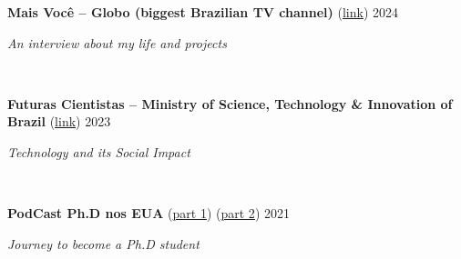 \documentclass[letterpaper,10pt]{article}
\newcommand{\entry}[4]{

\begin{minipage}[t]{.15\textwidth}
\end{minipage}
\hfill\vline\hfill 
\begin{minipage}[t]{0.95\textwidth}
#2 \hfill \textsc{#1}

\textit{#3}

\footnotesize{#4}
\end{minipage}\\\vspace{.25cm}}
\begin{document}
\entry{2024}{\textbf{Mais Você -- Globo (biggest Brazilian TV channel)} (\href{https://globoplay.globo.com/v/12673677/}{link})}{An interview about my life and projects}{}

\entry{2023}{\textbf{Futuras Cientistas -- Ministry of Science, Technology \& Innovation of Brazil} (\href{https://www.youtube.com/watch?v=g5Inc6qXO6k&ab_channel=FuturasCientistas}{link})}{Technology and its Social Impact}{}

\entry{2021}{\textbf{PodCast Ph.D nos EUA} (\href{https://open.spotify.com/episode/37Rn34gdy7AxNgHeAvdIH0?si=11bf338624d04113}{part 1}) (\href{https://open.spotify.com/episode/7zYdb51lXeKbfpULOgpQlx?si=d1dbd10b9197486e}{part 2})}{Journey to become a Ph.D student}{}
\end{document}
